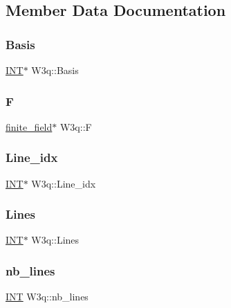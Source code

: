 \subsection{Member Data Documentation}
\mbox{\label{class_w3q_ab87f235d813a44c4f15732da74d6e70f}} 
\subsubsection{\texorpdfstring{Basis}{Basis}}
{\footnotesize\ttfamily \mbox{\hyperlink{galois_8h_a09fddde158a3a20bd2dcadb609de11dc}{I\+NT}}$\ast$ W3q\+::\+Basis}

\mbox{\label{class_w3q_a3989d8ebb5363eae87a4710bbdee3595}} 
\subsubsection{\texorpdfstring{F}{F}}
{\footnotesize\ttfamily \mbox{\hyperlink{classfinite__field}{finite\+\_\+field}}$\ast$ W3q\+::F}

\mbox{\label{class_w3q_afec587b227c37c399b316d51b8772092}} 
\subsubsection{\texorpdfstring{Line\+\_\+idx}{Line\_idx}}
{\footnotesize\ttfamily \mbox{\hyperlink{galois_8h_a09fddde158a3a20bd2dcadb609de11dc}{I\+NT}}$\ast$ W3q\+::\+Line\+\_\+idx}

\mbox{\label{class_w3q_a9d4e3ceae81ab3142c30b23a64b82824}} 
\subsubsection{\texorpdfstring{Lines}{Lines}}
{\footnotesize\ttfamily \mbox{\hyperlink{galois_8h_a09fddde158a3a20bd2dcadb609de11dc}{I\+NT}}$\ast$ W3q\+::\+Lines}

\mbox{\label{class_w3q_aaf61a5928b3873bc9090a360c6e99a81}} 
\subsubsection{\texorpdfstring{nb\+\_\+lines}{nb\_lines}}
{\footnotesize\ttfamily \mbox{\hyperlink{galois_8h_a09fddde158a3a20bd2dcadb609de11dc}{I\+NT}} W3q\+::nb\+\_\+lines}

